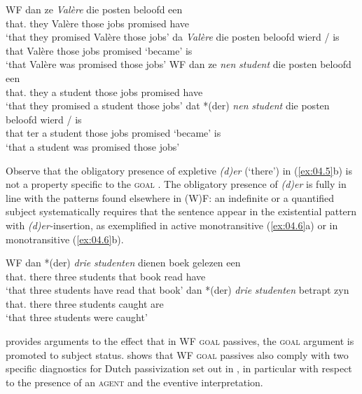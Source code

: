\documentclass[output=paper]{langsci/langscibook}
\begin{document}
\ea\label{ex:04.4}\glsdesc{WF}
    \ea
    \gll dan   ze   \textit{Valère}   die posten   beloofd   een\\
        that.\Pl{} they   Valère     those jobs   promised   have\\
    \glt ‘that they promised Valère those jobs’
    \ex
    \gll da   \textit{Valère}   die posten   beloofd   wierd / is\\
        that   Valère     those jobs   promised   ‘became’ {} is\\
    \glt ‘that Valère was promised those jobs’
    \z
\ex\label{ex:04.5}\glsdesc{WF}
    \ea
    \gll dan   ze   \textit{nen} \textit{student}  die posten   beloofd   een\\
        that.\Pl{} they   a student   those jobs   promised   have\\
    \glt ‘that they promised a student those jobs’
    \ex
    \gll dat   *(der)   \textit{nen} \textit{student}   die posten   beloofd   wierd / is\\
    that   \hphantom{*(}ter   a student   those jobs   promised   ‘became’ {} is\\
    \glt ‘that a student was promised those jobs’
    \z
\z

Observe that the obligatory presence of expletive \emph{(d)er} (‘there’) in
(\ref{ex:04.5}b) is not a property specific to the \textsc{goal} . The
obligatory presence of \emph{(d)er} is fully in line with the patterns found
elsewhere in (W)F: an indefinite or a quantified subject systematically
requires that the sentence appear in the existential pattern with
\emph{(d)er-}insertion, as exemplified in active monotransitive (\ref{ex:04.6}a)
or in  monotransitive (\ref{ex:04.6}b).

\ea\label{ex:04.6} \glsdesc{WF}
    \ea
\gll   dan   *(der)     \textit{drie} \textit{studenten}   dienen boek   gelezen   een\\
		    that.\Pl{} \hphantom{*(}there   three   students   that book   read     have\\
	\glt     ‘that three students have read that book’
    \ex
\gll   dan   *(der)     \textit{drie} \textit{studenten}   betrapt     zyn\\
		    that.\Pl{} \hphantom{*(}there   three   students   caught     are\\
	\glt     ‘that three students were caught’
    \z
\z

 provides arguments to the effect that in
\gls{WF} \textsc{goal} passives, the \textsc{goal} argument is
promoted to subject status.  shows that
\gls{WF} \textsc{goal} passives also comply with two specific
diagnostics for Dutch passivization set out in
\textcite{BroekhuisCornips2004,BroekhuisCornips2012}, in particular with
respect to the presence of an \textsc{agent} and the eventive interpretation.
\end{document}
